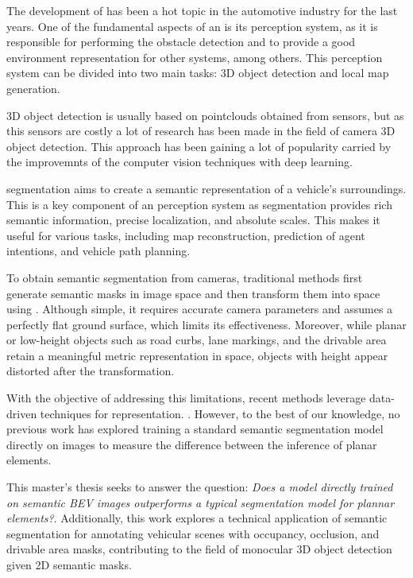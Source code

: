 
The development of  has been a hot topic in the automotive industry for the last years. One of the fundamental aspects of an  is its perception system, as it is responsible for performing the obstacle detection and to provide a good environment representation for other systems, among others. This perception system can be divided into two main tasks: 3D object detection and local  map generation. 

3D object detection is usually based on pointclouds obtained from  sensors, but as this sensors are costly a lot of research has been made in the field of camera 3D object detection. This approach has been gaining a lot of popularity carried by the improvemnts of the computer vision techniques with deep learning.

 segmentation aims to create a semantic representation of a vehicle's surroundings. This is a key component of an  perception system as  segmentation provides rich semantic information, precise localization, and absolute scales. This makes it useful for various tasks, including map reconstruction, prediction of agent intentions, and vehicle path planning.

To obtain  semantic segmentation from cameras, traditional methods first generate semantic masks in image space and then transform them into  space using . Although simple, it requires accurate camera parameters and assumes a perfectly flat ground surface, which limits its effectiveness. Moreover, while planar or low-height objects such as road curbs, lane markings, and the drivable area retain a meaningful metric representation in  space, objects with height appear distorted after the transformation.

With the objective of addressing this limitations, recent methods leverage data-driven techniques for  representation. \cite{view_parsing_network} \cite{lift_splat_shoot} \cite{m2bev}. However, to the best of our knowledge, no previous work has explored training a standard semantic segmentation model directly on  images to measure the difference between the inference of planar elements.

This master's thesis seeks to answer the question: \textit{Does a model directly trained on semantic BEV images outperforms a typical segmentation model for plannar elements?}. Additionally, this work explores a technical application of  semantic segmentation for annotating vehicular scenes with occupancy, occlusion, and drivable area masks, contributing to the field of monocular 3D object detection given 2D semantic masks.

